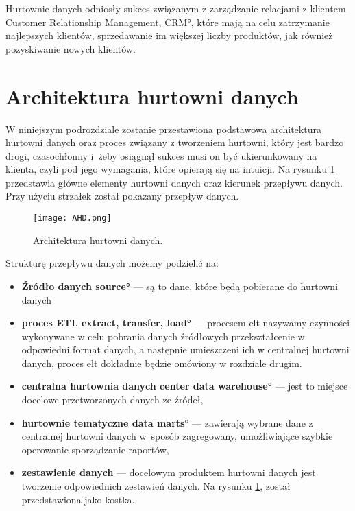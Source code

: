 Hurtownie danych odniosły sukces związanym z zarządzanie relacjami z klientem 
 \ang{Customer Relationship Management, CRM}, które mają na celu zatrzymanie najlepszych klientów,
 sprzedawanie im większej liczby produktów, jak również pozyskiwanie nowych klientów.

\section{Architektura hurtowni danych} \label{p_temat}
  W niniejszym podrozdziale zostanie przestawiona podstawowa architektura hurtowni danych oraz 
   proces związany z tworzeniem hurtowni, który jest bardzo drogi, czasochłonny 
   i~żeby osiągnął sukces musi on być ukierunkowany na klienta, czyli pod jego wymagania, 
   które opierają się na intuicji.
   Na rysunku \ref{fig:AHD} przedstawia główne elementy hurtowni danych oraz kierunek przepływu danych. Przy użyciu 
   strzałek został pokazany przepływ danych.

\begin{center}
\begin{figure}[H]
  \begin{center}
    \texttt{[image: AHD.png]}
  \end{center}
 \caption{Architektura hurtowni danych. }
    \label{fig:AHD}
\end{figure}
\end{center}


Strukturę przepływu danych możemy podzielić na:
\begin{itemize}
 \item \textbf{Źródło danych \ang{source} } --- 
    są to dane, które będą pobierane do hurtowni danych 
 \item \textbf{proces ETL \ang{extract, transfer, load} } --- 
    procesem elt nazywamy czynności wykonywane w celu pobrania danych źródłowych
    przekształcenie w odpowiedni format danych, a następnie umieszczeni ich w centralnej hurtowni danych,
    proces elt dokładnie będzie omówiony w rozdziale drugim.
 \item \textbf{centralna hurtownia danych \ang{center data  warehouse}} --- 
    jest to miejsce docelowe przetworzonych danych ze źródeł,						                                          
 \item \textbf{hurtownie tematyczne \ang{data marts}} --- 
    zawierają wybrane dane z centralnej hurtowni danych w~sposób 
    zagregowany, umożliwiające szybkie operowanie sporządzanie raportów,
 \item \textbf{zestawienie danych } --- 
    docelowym produktem hurtowni danych jest tworzenie odpowiednich zestawień danych.
    Na rysunku \ref{fig:AHD}, został przedstawiona jako kostka.
\end{itemize}

